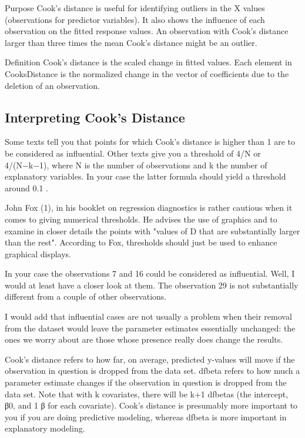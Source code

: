 \documentclass[residuals.tex]{subfiles}
\begin{document}
	
	Purpose
	Cook's distance is useful for identifying outliers in the X values (observations for predictor variables). It also shows the influence of each observation on the fitted response values. An observation with Cook's distance larger than three times the mean Cook's distance might be an outlier.
	
	Definition
	Cook's distance is the scaled change in fitted values. Each element in CooksDistance is the normalized change in the vector of coefficients due to the deletion of an observation. 
	
\subsection*{Interpreting Cook's Distance}	
Some texts tell you that points for which Cook's distance is higher than 1 are to be considered as influential. Other texts give you a threshold of 4/N or 4/(N−k−1), where N is the number of observations and k the number of explanatory variables. In your case the latter formula should yield a threshold around 0.1 .

John Fox (1), in his booklet on regression diagnostics is rather cautious when it comes to giving numerical thresholds. He advises the use of graphics and to examine in closer details the points with "values of D that are substantially larger than the rest". According to Fox, thresholds should just be used to enhance graphical displays.

In your case the observations 7 and 16 could be considered as influential. Well, I would at least have a closer look at them. The observation 29 is not substantially different from a couple of other observations.

I would add that influential cases are not usually a problem when their removal from the dataset would leave the parameter estimates essentially unchanged: the ones we worry about are those whose presence really does change the results. 


Cook's distance refers to how far, on average, predicted y-values will move if the observation in question is dropped from the data set. dfbeta refers to how much a parameter estimate changes if the observation in question is dropped from the data set. Note that with k covariates, there will be k+1 dfbetas (the intercept, β0, and 1 β for each covariate). Cook's distance is presumably more important to you if you are doing predictive modeling, whereas dfbeta is more important in explanatory modeling.
\end{document}
